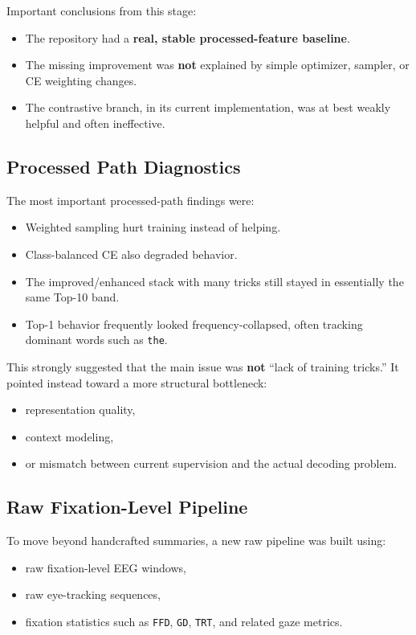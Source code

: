 \documentclass[11pt]{article}
\begin{document}
Important conclusions from this stage:
\begin{itemize}
    \item The repository had a \textbf{real, stable processed-feature baseline}.
    \item The missing improvement was \textbf{not} explained by simple optimizer, sampler, or CE weighting changes.
    \item The contrastive branch, in its current implementation, was at best weakly helpful and often ineffective.
\end{itemize}

\subsection{Processed Path Diagnostics}

The most important processed-path findings were:
\begin{itemize}
    \item Weighted sampling hurt training instead of helping.
    \item Class-balanced CE also degraded behavior.
    \item The improved/enhanced stack with many tricks still stayed in essentially the same Top-10 band.
    \item Top-1 behavior frequently looked frequency-collapsed, often tracking dominant words such as \texttt{the}.
\end{itemize}

This strongly suggested that the main issue was \textbf{not} ``lack of training tricks.'' It pointed instead toward a more structural bottleneck:
\begin{itemize}
    \item representation quality,
    \item context modeling,
    \item or mismatch between current supervision and the actual decoding problem.
\end{itemize}

\subsection{Raw Fixation-Level Pipeline}

To move beyond handcrafted summaries, a new raw pipeline was built using:
\begin{itemize}
    \item raw fixation-level EEG windows,
    \item raw eye-tracking sequences,
    \item fixation statistics such as \texttt{FFD}, \texttt{GD}, \texttt{TRT}, and related gaze metrics.
\end{itemize}
\end{document}

